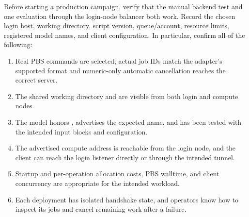 \documentclass[
  11pt,
  a4paper,
]{article}
\providecommand{\tightlist}{%
  \setlength{\itemsep}{0pt}\setlength{\parskip}{0pt}}
\DeclareRobustCommand{\InlineCode}[1]{{\ttfamily\upshape\seqsplit{#1}}}
\begin{document}
Before starting a production campaign, verify that the manual backend
test and one evaluation through the login-node balancer both work.
Record the chosen login host, working directory, script version,
queue/account, resource limits, registered model names, and client
configuration. In particular, confirm all of the following:

\begin{enumerate}
\def\labelenumi{\arabic{enumi}.}
\tightlist
\item
  Real PBS commands are selected; actual job IDs match the adapter's
  supported format and numeric-only automatic cancellation reaches the
  correct server.
\item
  The shared working directory and \InlineCode{pbs\_scripts/job.sh} are
  visible from both login and compute nodes.
\item
  The model honors \InlineCode{PORT}, advertises the expected name, and
  has been tested with the intended input blocks and configuration.
\item
  The advertised compute address is reachable from the login node, and
  the client can reach the login listener directly or through the
  intended tunnel.
\item
  Startup and per-operation allocation costs, PBS walltime, and client
  concurrency are appropriate for the intended workload.
\item
  Each deployment has isolated handshake state, and operators know how
  to inspect its jobs and cancel remaining work after a failure.
\end{enumerate}
\end{document}
